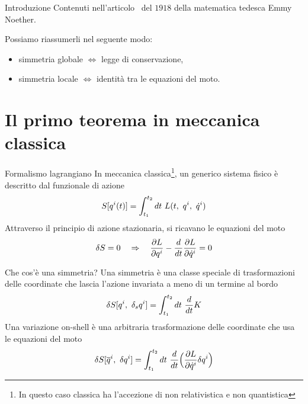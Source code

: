 

\begin{frame}
    \titlepage
\end{frame}


\begin{frame}{Introduzione}
    Contenuti nell'articolo~ del $1918$ della matematica tedesca Emmy Noether. 

    \hfill

      Possiamo riassumerli nel seguente modo:
    \begin{itemize}
        \item simmetria globale $\iff$ legge di conservazione,
        \item simmetria locale $\iff$ identità tra le equazioni del moto.
    \end{itemize}
\end{frame}

\section{Il primo teorema in meccanica classica}

\begin{frame}{Formalismo lagrangiano}
    In meccanica classica\footnote{In questo caso classica ha l'accezione di non relativistica e non quantistica}, un generico sistema fisico è descritto dal funzionale di azione
    \begin{equation*}
         S[q^i(t)] = \int_{t_1}^{t_2}dt~ L(t, ~q^i, ~\dot q^i)
    \end{equation*} 
      Attraverso il principio di azione stazionaria, si ricavano le equazioni del moto
    \begin{equation*}
        \delta S = 0 \quad \Rightarrow \quad \frac{\partial L}{\partial q^i} - \frac{d}{dt} \frac{\partial L}{\partial\dot q^i} = 0
    \end{equation*}
\end{frame}

\begin{frame}{Che cos'è una simmetria?}
    Una simmetria è una classe speciale di trasformazioni delle coordinate che lascia l'azione invariata a meno di un termine al bordo
    \begin{equation*}
        \delta S[q^i, ~\delta_s q^i] = \int_{t_1}^{t_2}dt~ \frac{d}{dt} K
    \end{equation*}
      Una variazione on-shell è una arbitraria trasformazione delle coordinate che usa le equazioni del moto
    \begin{equation*}
        \delta S[\overline q^i, ~\delta q^i] = \int_{t_1}^{t_2}dt~ \frac{d}{dt} \Big( \frac{\partial L}{\partial\dot q^i} \delta q^i \Big )
    \end{equation*}
\end{frame}

